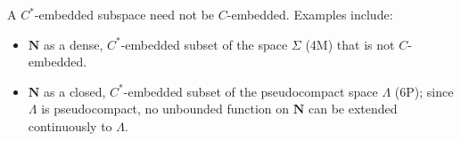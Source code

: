 A $C^*$-embedded subspace need not be $C$-embedded. Examples include:
\begin{itemize}
\item $\mathbf{N}$ as a dense, $C^*$-embedded subset of the space $\Sigma$ (4M) that is not $C$-embedded.
\item $\mathbf{N}$ as a closed, $C^*$-embedded subset of the pseudocompact space $\Lambda$ (6P); since $\Lambda$ is pseudocompact, no unbounded function on $\mathbf{N}$ can be extended continuously to $\Lambda$.
\end{itemize}
